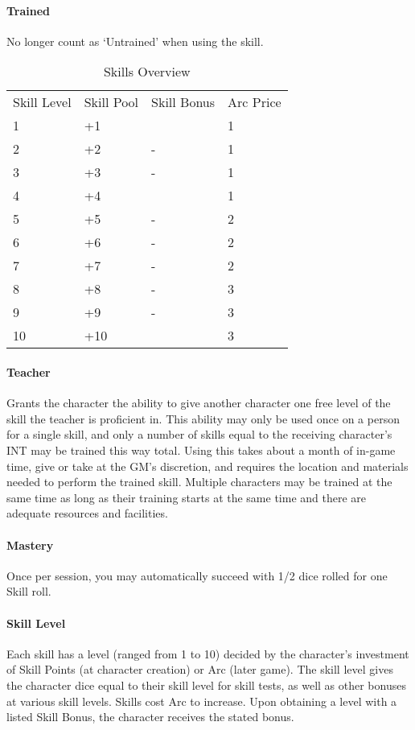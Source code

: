 \documentclass[oneside,11pt,english]{book}
\begin{document}
\paragraph{\label{par:Trained}Trained} No longer count as ‘Untrained’ when using the skill.\\
\begin{wraptable}{r}{9.5 cm} %
	\centering
	\begin{tabu} spread 0pt{X[c]X[c]XX[c]}
		Skill Level&Skill Pool&	Skill Bonus&Arc Price\\
		1&			+1&			&	1\\
		2&			+2&			-&			1\\
		3&			+3&			-&			1\\
		4&			+4&			&	1\\
		5&			+5&			-&			2\\
		6&			+6&			-&			2\\
		7&			+7&			-&			2\\
		8&			+8&			-&			3\\
		9&			+9&			-&			3\\
		10&			+10&		&3\\
	\end{tabu}
	\caption{Skills Overview}
	\label{tab:Skill Levels Overview}
\end{wraptable}
\paragraph{\label{par:Teacher}Teacher} Grants the character the ability to give another character one free level of the skill the teacher is proficient in. This ability may only be used once on a person for a single skill, and only a number of skills equal to the receiving character’s INT may be trained this way total. Using this takes about a month of in-game time, give or take at the GM’s discretion, and requires the location and materials needed to perform the trained skill. Multiple characters may be trained at the same time as long as their training starts at the same time and there are adequate resources and facilities.
\paragraph{\label{par:Mastery}Mastery} Once per session, you may automatically succeed with 1/2 dice rolled for one Skill roll.
\paragraph{\label{par:Skill Level}Skill Level} Each skill has a level (ranged from 1 to 10) decided by the character’s investment of Skill Points (at character creation) or Arc (later game). The skill level gives the character dice equal to their skill level for skill tests, as well as other bonuses at various skill levels. Skills cost Arc to increase. Upon obtaining a level with a listed Skill Bonus, the character receives the stated bonus.
\end{document}

